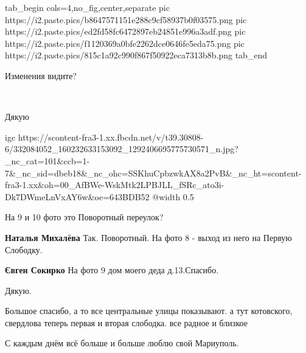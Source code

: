  
 
 
 
 

\qqSecCmt


\ifcmt
  tab_begin cols=4,no_fig,center,separate
     pic https://i2.paste.pics/b8647571151e288c9cf58937b0f03575.png
		 pic https://i2.paste.pics/ed2fd58fc6472897eb24851e996a3adf.png
		 pic https://i2.paste.pics/f1120369a0bfe2262dce0646fe5eda75.png
		 pic https://i2.paste.pics/815c1a92c990f867f50922eca7313b8b.png
  tab_end
\fi


Изменения видите?

🙏🙏🙏


Дякую🙏💓


\ifcmt
  igc https://scontent-fra3-1.xx.fbcdn.net/v/t39.30808-6/332084052_160232633153092_1292406695775730571_n.jpg?_nc_cat=101&ccb=1-7&_nc_sid=dbeb18&_nc_ohc=SSKhuCpbzwkAX8a2PvB&_nc_ht=scontent-fra3-1.xx&oh=00_AfBWe-WskMtk2LPBJLL_fSRc_ato3i-Dk7DWmeLnVxAY6w&oe=643BDB52
	@width 0.5
\fi


На 9 и 10 фото это Поворотный переулок?

\begin{itemize} %
\textbf{Наталья Михалёва} Так. Поворотный. На фото 8 - выход из него на Первую Слободку.

\textbf{Євген Сокирко} На фото 9 дом моего деда д.13.Спасибо.
\end{itemize} %


Дякую.


Большое спасибо, а то все центральные улицы показывают. а тут котовского,
свердлова теперь первая и вторая слободка. все радное и близкое


С каждым днём всё больше и больше люблю свой Мариуполь.
